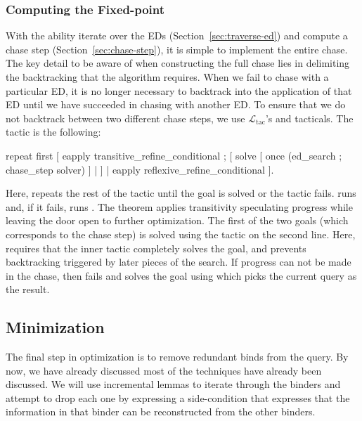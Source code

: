 \documentclass[preprint]{sigplanconf}
\newcommand{\ltac}[0]{\ensuremath{\mathcal{L}_{\mathrm{tac}}}}
\begin{document}
\subsubsection{Computing the Fixed-point}
With the ability iterate over the EDs (Section~\ref{sec:traverse-ed}) and compute a chase step (Section~\ref{sec:chase-step}), it is simple to implement the entire chase.
The key detail to be aware of when constructing the full chase lies in delimiting the backtracking that the algorithm requires.
When we fail to chase with a particular ED, it is no longer necessary to backtrack into the application of that ED until we have succeeded in chasing with another ED.
To ensure that we do not backtrack between two different chase steps, we use \ltac's  and  tacticals.
The tactic is the following:
\begin{coq}
repeat first
   [ eapply transitive_refine_conditional ;
     [ solve [ once (ed_search ; chase_step solver) ]
     | ]
   | eapply reflexive_refine_conditional ].
\end{coq}
Here,  repeats the rest of the tactic until the goal is solved or the tactic fails.
 runs  and, if it fails, runs .
The  theorem applies transitivity speculating progress while leaving the door open to further optimization.
The first of the two goals (which corresponds to the chase step) is solved using the tactic on the second line.
Here,  requires that the inner tactic completely solves the goal, and  prevents backtracking triggered by later pieces of the search.
If progress can not be made in the chase, then  fails and  solves the goal using  which picks the current query as the result.


\subsection{Minimization}
\label{sec:minimization}

The final step in optimization is to remove redundant binds from the query.
By now, we have already discussed most of the techniques have already been discussed.
We will use incremental lemmas to iterate through the binders and attempt to drop each one by expressing a side-condition that expresses that the information in that binder can be reconstructed from the other binders.
\end{document}
